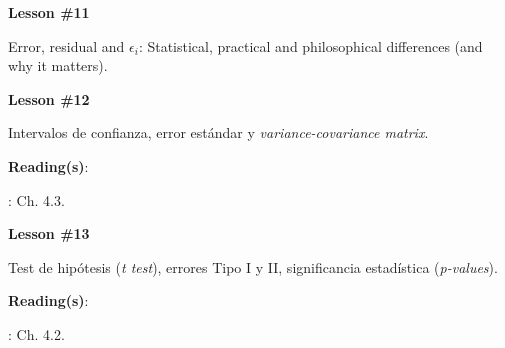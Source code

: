 \documentclass[letterpaper]{article}
\renewenvironment{itemize}{
  \begin{list}{}{
    \setlength{\leftmargin}{1.5em}
  }
}{
  \end{list}
}
\begin{document}
\begin{enumerate}
			\begin{itemize} 
				\item[$\bullet$] {\bf Lesson \#11}
					\begin{itemize} 
						\item[$\circ$] Error, residual and $\epsilon_{i}$: Statistical, practical and philosophical differences (and why it matters).
					\end{itemize}
			\end{itemize}


			\begin{itemize} 
				\item[$\bullet$] {\bf Lesson \#12}
					\begin{itemize} 
						\item[$\circ$] Intervalos de confianza, error est\'andar y \emph{variance-covariance matrix}. %
						\item[$\circ$] {\bf Reading(s)}: 
							\begin{itemize}
								\item[$\diamond$] \textcite{Wooldridge2010}: Ch. 4.3.
							\end{itemize}
					\end{itemize}
			\end{itemize}



			\begin{itemize} 
				\item[$\bullet$] {\bf Lesson \#13}
					\begin{itemize} 
						\item[$\circ$] Test de hip\'otesis (\emph{t test}), errores Tipo I y II,  significancia estad\'istica (\emph{p-values}). 
						\item[$\circ$] {\bf Reading(s)}: 
							\begin{itemize}
								\item[$\diamond$] \textcite{Wooldridge2010}: Ch. 4.2.
							\end{itemize}
					\end{itemize}
			\end{itemize}




\end{enumerate}
\end{document}
